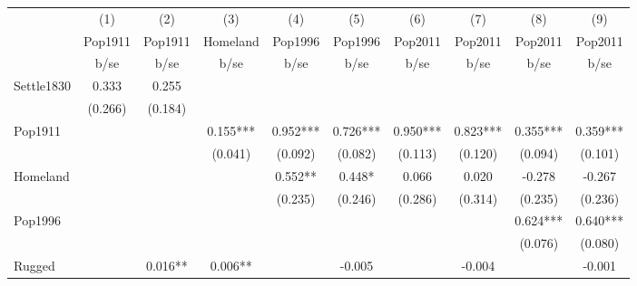 {
\def\sym#1{\ifmmode^{#1}\else\(^{#1}\)\fi}
\begin{tabular}{l*{9}{c}}
\hline\hline
                    &\multicolumn{1}{c}{(1)}&\multicolumn{1}{c}{(2)}&\multicolumn{1}{c}{(3)}&\multicolumn{1}{c}{(4)}&\multicolumn{1}{c}{(5)}&\multicolumn{1}{c}{(6)}&\multicolumn{1}{c}{(7)}&\multicolumn{1}{c}{(8)}&\multicolumn{1}{c}{(9)}\\
                    &\multicolumn{1}{c}{Pop1911}&\multicolumn{1}{c}{Pop1911}&\multicolumn{1}{c}{Homeland}&\multicolumn{1}{c}{Pop1996}&\multicolumn{1}{c}{Pop1996}&\multicolumn{1}{c}{Pop2011}&\multicolumn{1}{c}{Pop2011}&\multicolumn{1}{c}{Pop2011}&\multicolumn{1}{c}{Pop2011}\\
                    &        b/se   &        b/se   &        b/se   &        b/se   &        b/se   &        b/se   &        b/se   &        b/se   &        b/se   \\
\hline
Settle1830          &       0.333   &       0.255   &               &               &               &               &               &               &               \\
                    &     (0.266)   &     (0.184)   &               &               &               &               &               &               &               \\
Pop1911             &               &               &       0.155***&       0.952***&       0.726***&       0.950***&       0.823***&       0.355***&       0.359***\\
                    &               &               &     (0.041)   &     (0.092)   &     (0.082)   &     (0.113)   &     (0.120)   &     (0.094)   &     (0.101)   \\
Homeland            &               &               &               &       0.552** &       0.448*  &       0.066   &       0.020   &      -0.278   &      -0.267   \\
                    &               &               &               &     (0.235)   &     (0.246)   &     (0.286)   &     (0.314)   &     (0.235)   &     (0.236)   \\
Pop1996             &               &               &               &               &               &               &               &       0.624***&       0.640***\\
                    &               &               &               &               &               &               &               &     (0.076)   &     (0.080)   \\
Rugged              &               &       0.016** &       0.006** &               &      -0.005   &               &      -0.004   &               &      -0.001   \\

\end{tabular}}
